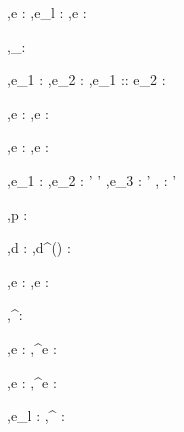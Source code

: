 
  {\Gamma,\Sigma \infers e :  \Quad
    \Quad
   \Gamma,\Sigma \infers e_l : \tau}
  {\Gamma,\Sigma \infers \Case e \Of {} : \tau}
  {}


  {}
  {\Gamma,\Sigma \infers [\ ]_\tau : \List \tau}
  {}

  {\Gamma,\Sigma \infers e_1 : \tau \Quad
   \Gamma,\Sigma \infers e_2 : \List \tau}
  {\Gamma,\Sigma \infers e_1 :: e_2 : \List \tau}
  {}

  {\Gamma,\Sigma \infers e : \List\tau}
  {\Gamma,\Sigma \infers \Head e : \tau}
  {}

  {\Gamma,\Sigma \infers e : \List\tau}
  {\Gamma,\Sigma \infers \Tail e : \List\tau}
  {}

  {\Gamma,\Sigma \infers e_1 : \List\tau \Quad
   \Gamma,\Sigma \infers e_2 : \tau \to \tau' \to \tau' \Quad
   \Gamma,\Sigma \infers e_3 : \tau'}
  {\Gamma,\Sigma \infers {} : \tau'}
  {}


  {\Gamma,\Sigma \infers p : \Task\ \tau}


  {\Gamma,\Sigma \infers d : \Task \tau}
  {\Gamma,\Sigma \infers d^{(\nu)} : \Task \tau}
  {}

  {\Gamma,\Sigma \infers e : \tau}
  {\Gamma,\Sigma \infers \Lift e : \Task \tau}
  {}

  {}
  {\Gamma,\Sigma \infers \Enter^\nu \beta : \Task \beta}
  {}

  {\Gamma,\Sigma \infers e : \beta}
  {\Gamma,\Sigma \infers \Update^\nu e : \Task \beta}
  {}

  {\Gamma,\Sigma \infers e : \beta}
  {\Gamma,\Sigma \infers \View^\nu e : \Task \beta}
  {}

  { \Quad
   \Gamma,\Sigma \infers e_l : \Task \tau}
  {\Gamma,\Sigma \infers \Select^\nu {} : \Task \tau}
  {}


